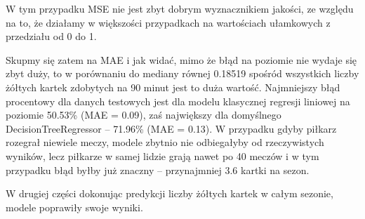 \documentclass{article}
\begin{document}
W tym przypadku MSE nie jest zbyt dobrym wyznacznikiem jakości, ze względu na to, że działamy w większości przypadkach na wartościach ułamkowych z przedziału od 0 do 1. 

Skupmy się zatem na MAE i jak widać, mimo że błąd na poziomie nie wydaje się zbyt duży, to w porównaniu do mediany równej 0.18519 spośród wszystkich liczby żółtych kartek zdobytych na 90 minut jest to duża wartość. Najmniejszy błąd procentowy dla danych testowych jest dla modelu klasycznej regresji liniowej na poziomie 50.53\% (MAE = 0.09), zaś największy dla domyślnego DecisionTreeRegressor – 71.96\% (MAE = 0.13). W przypadku gdyby piłkarz rozegrał niewiele meczy, modele zbytnio nie odbiegałyby od rzeczywistych wyników, lecz piłkarze w samej lidzie grają nawet po 40 meczów i w tym przypadku błąd byłby już znaczny – przynajmniej 3.6 kartki na sezon.
\vspace{0.5cm}

W drugiej części dokonując predykcji liczby żółtych kartek w całym sezonie, modele poprawiły swoje wyniki.
\end{document}
